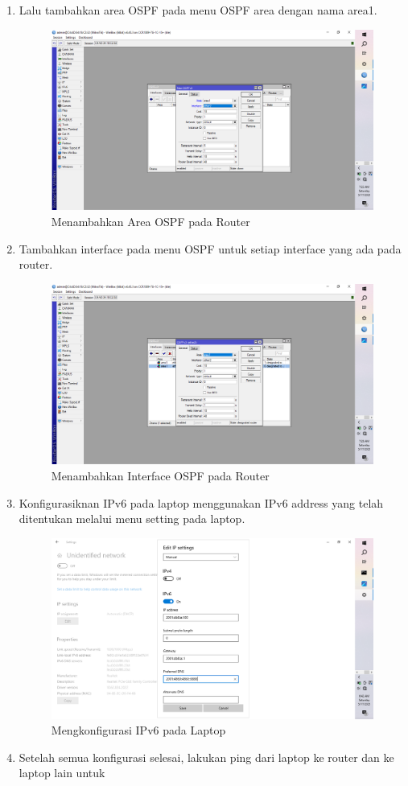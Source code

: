 \begin{enumerate}
\begin{figure}[H]
    \end{figure}    
    \item Lalu tambahkan area OSPF pada menu OSPF area dengan nama area1.
    \begin{figure}[H]
        \centering
        \includegraphics[width=0.5\linewidth]{gambar6.png}
        \caption{Menambahkan Area OSPF pada Router}
        \label{fig:gambar7}
    \end{figure}
    \item Tambahkan interface pada menu OSPF untuk setiap interface yang ada pada router.
    \begin{figure}[H]
        \centering
        \includegraphics[width=0.5\linewidth]{gambar7.png}
        \caption{Menambahkan Interface OSPF pada Router}
        \label{fig:gambar8}
    \end{figure}
        \item Konfigurasiknan IPv6 pada laptop menggunakan IPv6 address yang telah ditentukan melalui menu
    setting pada laptop.
    \begin{figure}[H]
        \centering
        \includegraphics[width=0.5\linewidth]{gambar4.png}
        \caption{Mengkonfigurasi IPv6 pada Laptop}
        \label{fig:gambar4}
    \end{figure}
    \item Setelah semua konfigurasi selesai, lakukan ping dari laptop ke router dan ke laptop lain untuk

\end{enumerate}
